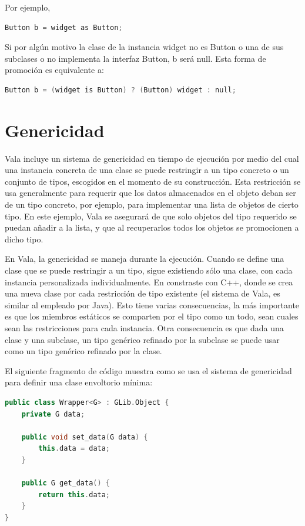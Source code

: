 \documentclass[12pt,twoside]{book}
\begin{document}
Por ejemplo,

\begin{lstlisting}[language=C++]
Button b = widget as Button;
\end{lstlisting}

Si por algún motivo la clase de la instancia widget no es Button o una de sus subclases o no implementa la interfaz Button, b será null. Esta forma de promoción es equivalente a:

\begin{lstlisting}[language=C++]
Button b = (widget is Button) ? (Button) widget : null;
\end{lstlisting}


\section{Genericidad}

Vala incluye un sistema de genericidad en tiempo de ejecución por medio del cual una instancia concreta de una clase se puede restringir a un tipo concreto o un conjunto de tipos, escogidos en el momento de su construcción. Esta restricción se usa generalmente para requerir que los datos almacenados en el objeto deban ser de un tipo concreto, por ejemplo, para implementar una lista de objetos de cierto tipo. En este ejemplo, Vala se asegurará de que solo objetos del tipo requerido se puedan añadir a la lista, y que al recuperarlos todos los objetos se promocionen a dicho tipo.

En Vala, la genericidad se maneja durante la ejecución. Cuando se define una clase que se puede restringir a un tipo, sigue existiendo sólo una clase, con cada instancia personalizada individualmente. En constraste con C++, donde se crea una nueva clase por cada restricción de tipo existente (el sistema de Vala, es similar al empleado por Java). Esto tiene varias consecuencias, la más importante es que los miembros estáticos se comparten por el tipo como un todo, sean cuales sean las restricciones para cada instancia. Otra consecuencia es que dada una clase y una subclase, un tipo genérico refinado por la subclase se puede usar como un tipo genérico refinado por la clase.

El siguiente fragmento de código muestra como se usa el sistema de genericidad para definir una clase envoltorio mínima:

\begin{lstlisting}[language=C++]
public class Wrapper<G> : GLib.Object {
	private G data;
	
	public void set_data(G data) {
		this.data = data;
	}
	
	public G get_data() {
		return this.data;
	}
}
\end{lstlisting}
\end{document}
